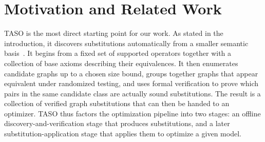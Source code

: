 \documentclass[sigplan,10pt,nonacm]{acmart}
\begin{document}




\section{Motivation and Related Work}
\label{sec:background}

TASO is the most direct starting point for our work. As stated in the introduction, it discovers substitutions automatically from a smaller semantic basis~\cite{jia2019taso}. It begins from a fixed set of supported operators together with a collection of base axioms describing their equivalences. It then enumerates candidate graphs up to a chosen size bound, groups together graphs that appear equivalent under randomized testing, and uses formal verification to prove which pairs in the same candidate class are actually sound substitutions. The result is a collection of verified graph substitutions that can then be handed to an optimizer. TASO thus factors the optimization pipeline into two stages: an offline discovery-and-verification stage that produces substitutions, and a later substitution-application stage that applies them to optimize a given model.
\end{document}

